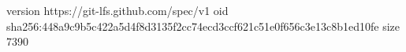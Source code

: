 version https://git-lfs.github.com/spec/v1
oid sha256:448a9c9b5c422a5d4f8d3135f2cc74ecd3ccf621c51e0f656c3e13c8b1ed10fe
size 7390
